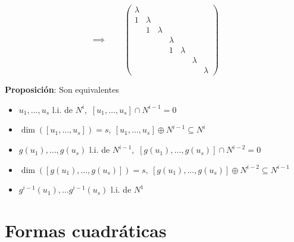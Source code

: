 \documentclass{myclass}
\begin{document}
\begin{multicols}{2}

\columnbreak 
$$ 
\implies \qquad 
\begin{pmatrix}
\lambda & & & & & & \\
1& \lambda & & & & & \\
& 1&\lambda  & & & & \\
& & &\lambda  & & & \\
& & &1 &\lambda  & & \\
& & & & &\lambda  & \\
& & & & & &\lambda 
\end{pmatrix}
$$

\end{multicols}

\textbf{Proposición}: Son equivalentes
\begin{itemize}
    \item $u_1, \ldots , u_s$ l.i. de $N^i$,\  $[u_1, \ldots , u_s]\cap N^{i-1}=0$
    \item $\dim([u_1, \ldots, u_s]) = s, \ [u_1, \ldots , u_s]\oplus N^{i-1} \subseteq N^i$
    \item $g(u_1), \ldots , g(u_s)$ l.i. de $N^{i-1}$,\  $[g(u_1), \ldots , g(u_s)]\cap N^{i-2}=0$
    \item $\dim([g(u_1), \ldots, g(u_s)]) = s, \ [g(u_1), \ldots , g(u_s)]\oplus N^{i-2} \subseteq N^{i-1}$
    \item $g^{i-1}(u_1), \ldots g^{i-1}(u_s)$ l.i. de $N^1$
\end{itemize}

\section{Formas cuadráticas}
\end{document}

